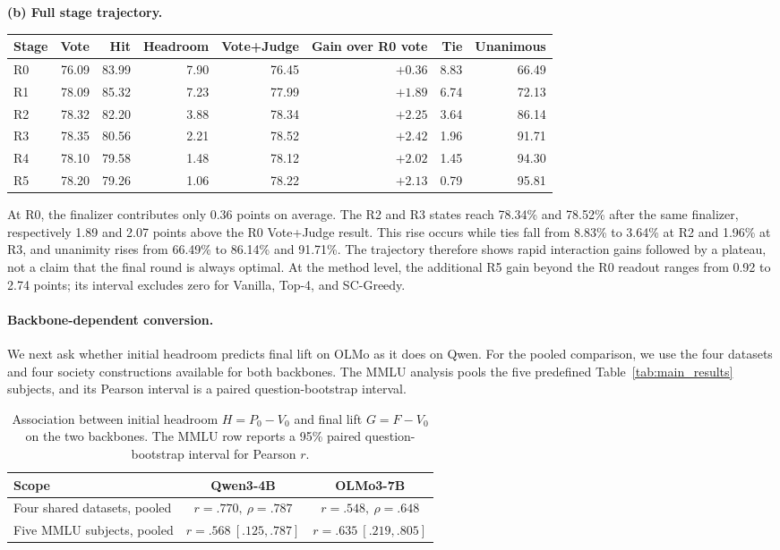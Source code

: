 \begin{table}[H]
\vspace{0.7em}
\textbf{(b) Full stage trajectory.}\\[0.2em]
\small
\begin{tabular}{lrrrrrrr}
\toprule
Stage & Vote & Hit & Headroom & Vote+Judge & Gain over R0 vote & Tie & Unanimous \\
\midrule
R0 & 76.09 & 83.99 & 7.90 & 76.45 & $+0.36$ & 8.83 & 66.49 \\
R1 & 78.09 & 85.32 & 7.23 & 77.99 & $+1.89$ & 6.74 & 72.13 \\
R2 & 78.32 & 82.20 & 3.88 & 78.34 & $+2.25$ & 3.64 & 86.14 \\
R3 & 78.35 & 80.56 & 2.21 & 78.52 & $+2.42$ & 1.96 & 91.71 \\
R4 & 78.10 & 79.58 & 1.48 & 78.12 & $+2.02$ & 1.45 & 94.30 \\
R5 & 78.20 & 79.26 & 1.06 & 78.22 & $+2.13$ & 0.79 & 95.81 \\
\bottomrule
\end{tabular}
\end{table}

At R0, the finalizer contributes only 0.36 points on average. The R2 and R3
states reach 78.34\% and 78.52\% after the same finalizer, respectively 1.89
and 2.07 points above the R0 Vote+Judge result. This rise occurs while ties
fall from 8.83\% to 3.64\% at R2 and 1.96\% at R3, and unanimity rises from
66.49\% to 86.14\% and 91.71\%. The trajectory therefore shows rapid
interaction gains followed by a plateau, not a claim that the final round is
always optimal. At the method level, the additional R5 gain beyond the R0
readout ranges from 0.92 to 2.74 points; its interval excludes zero for
Vanilla, Top-4, and SC-Greedy.

\paragraph{Backbone-dependent conversion.}
We next ask whether initial headroom predicts final lift on OLMo as it does on
Qwen. For the pooled comparison, we use the four datasets and four society
constructions available for both backbones. The MMLU analysis pools the five
predefined Table~\ref{tab:main_results} subjects, and its Pearson interval is a
paired question-bootstrap interval.

\begin{table}[H]
\centering
\caption{Association between initial headroom $H=P_0-V_0$ and final lift
$G=F-V_0$ on the two backbones. The MMLU row reports a 95\% paired
question-bootstrap interval for Pearson $r$.}
\label{tab:backbone_headroom_conversion}
\small
\begin{tabular}{lcc}
\toprule
Scope & Qwen3-4B & OLMo3-7B \\
\midrule
Four shared datasets, pooled & $r=.770,\ \rho=.787$ & $r=.548,\ \rho=.648$ \\
Five MMLU subjects, pooled & $r=.568\ [.125,.787]$ & $r=.635\ [.219,.805]$ \\
\bottomrule
\end{tabular}
\end{table}

